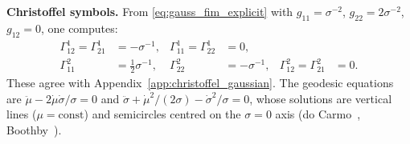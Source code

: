 \documentclass[a4paper,fleqn]{cas-dc}
\begin{document}
\textbf{Christoffel symbols.}
From \eqref{eq:gauss_fim_explicit} with $g_{11}=\sigma^{-2}$,
$g_{22}=2\sigma^{-2}$, $g_{12}=0$, one computes:
\begin{equation}
\begin{aligned}
  \Gamma^1_{12} = \Gamma^1_{21} &= -\sigma^{-1}, &
  \Gamma^1_{11} = \Gamma^1_{22} &= 0, \\
  \Gamma^2_{11} &= \tfrac{1}{2}\sigma^{-1}, &
  \Gamma^2_{22} &= -\sigma^{-1}, &
  \Gamma^2_{12} = \Gamma^2_{21} &= 0.
\end{aligned}
  \label{eq:gauss_christoffel_app}
\end{equation}
These agree with Appendix~\ref{app:christoffel_gaussian}.
The geodesic equations are
$\ddot\mu - 2\dot\mu\dot\sigma/\sigma = 0$ and
$\ddot\sigma + \dot\mu^2/(2\sigma) - \dot\sigma^2/\sigma = 0$,
whose solutions are vertical lines ($\mu=\mathrm{const}$) and
semicircles centred on the $\sigma=0$ axis
(do Carmo~\cite{do2002riemannian}, Boothby~\cite{boothby1986differentiable}).


\end{document}

